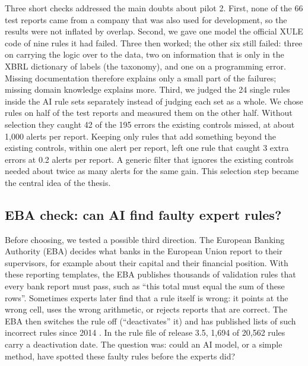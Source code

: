 \documentclass[11pt,a4paper]{article}
\begin{document}
Three short checks addressed the main doubts about pilot 2. First, none of the 66 test reports came from a company that was also used for development, so the results were not inflated by overlap. Second, we gave one model the official XULE code of nine rules it had failed. Three then worked; the other six still failed: three on carrying the logic over to the data, two on information that is only in the XBRL dictionary of labels (the taxonomy), and one on a programming error. Missing documentation therefore explains only a small part of the failures; missing domain knowledge explains more. Third, we judged the 24 single rules inside the AI rule sets separately instead of judging each set as a whole. We chose rules on half of the test reports and measured them on the other half. Without selection they caught 42 of the 195 errors the existing controls missed, at about 1{,}000 alerts per report. Keeping only rules that add something beyond the existing controls, within one alert per report, left one rule that caught 3 extra errors at 0.2 alerts per report. A generic filter that ignores the existing controls needed about twice as many alerts for the same gain. This selection step became the central idea of the thesis.

\subsection{EBA check: can AI find faulty expert rules?}

Before choosing, we tested a possible third direction. The European Banking Authority (EBA) decides what banks in the European Union report to their supervisors, for example about their capital and their financial position. With these reporting templates, the EBA publishes thousands of validation rules that every bank report must pass, such as ``this total must equal the sum of these rows''. Sometimes experts later find that a rule itself is wrong: it points at the wrong cell, uses the wrong arithmetic, or rejects reports that are correct. The EBA then switches the rule off (``deactivates'' it) and has published lists of such incorrect rules since 2014 \cite{eba}. In the rule file of release 3.5, 1{,}694 of 20{,}562 rules carry a deactivation date. The question was: could an AI model, or a simple method, have spotted these faulty rules before the experts did?
\end{document}
